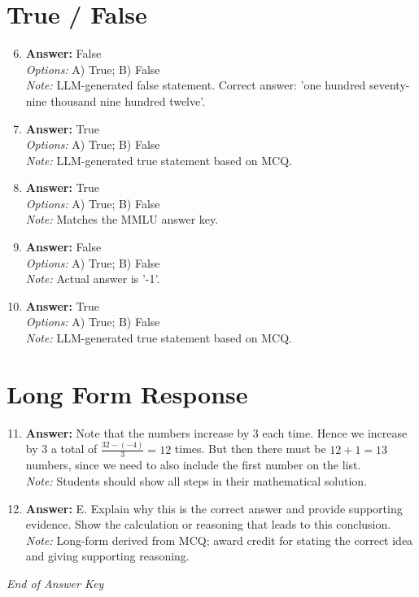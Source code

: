 \documentclass[12pt]{article}
\begin{document}
\section*{True / False}
\begin{enumerate}[label=\arabic*.]
\setcounter{enumi}{5}
\item \textbf{Answer:} False
\\ \textit{Options:} A) True; B) False
\\ \textit{Note:} LLM-generated false statement. Correct answer: 'one hundred seventy-nine thousand nine hundred twelve'.
\item \textbf{Answer:} True
\\ \textit{Options:} A) True; B) False
\\ \textit{Note:} LLM-generated true statement based on MCQ.
\item \textbf{Answer:} True
\\ \textit{Options:} A) True; B) False
\\ \textit{Note:} Matches the MMLU answer key.
\item \textbf{Answer:} False
\\ \textit{Options:} A) True; B) False
\\ \textit{Note:} Actual answer is '-1'.
\item \textbf{Answer:} True
\\ \textit{Options:} A) True; B) False
\\ \textit{Note:} LLM-generated true statement based on MCQ.
\end{enumerate}

\section*{Long Form Response}
\begin{enumerate}[label=\arabic*.]
\setcounter{enumi}{10}
\item \textbf{Answer:} Note that the numbers increase by 3 each time. Hence we increase by 3 a total of $\frac{32 - (-4)}{3} = 12$ times. But then there must be $12 + 1 = \boxed{13}$ numbers, since we need to also include the first number on the list.
\\ \textit{Note:} Students should show all steps in their mathematical solution.
\item \textbf{Answer:} E. Explain why this is the correct answer and provide supporting evidence. Show the calculation or reasoning that leads to this conclusion.
\\ \textit{Note:} Long-form derived from MCQ; award credit for stating the correct idea and giving supporting reasoning.
\end{enumerate}

\vfill
\noindent\textit{End of Answer Key}
\end{document}
